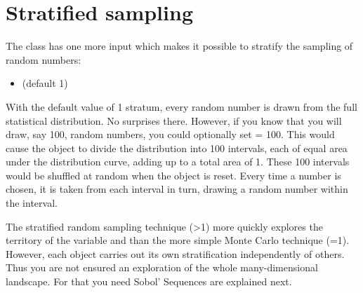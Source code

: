 \section{Stratified sampling}
The  class has one more input which makes it possible to stratify the sampling of random numbers:
\begin{itemize}
\item {} (default 1)
\end{itemize}
With the default value of 1 stratum, every random number is drawn from the full statistical distribution. No surprises there. However, if you know that you will draw, say 100, random numbers, you could optionally set  = 100. This would cause the  object to divide the distribution into 100 intervals, each of equal area under the distribution curve, adding up to a total area of 1. These 100 intervals would be shuffled at random when the object is reset. Every time a number is chosen, it is taken from each interval in turn, drawing a random number within the interval. 

The stratified random sampling technique (>1) more quickly explores the territory of the variable and than the more simple Monte Carlo technique (=1). However, each  object carries out its own stratification independently of others. Thus you are not ensured an exploration of the whole many-dimensional landscape. For that you need Sobol' Sequences are explained next.

